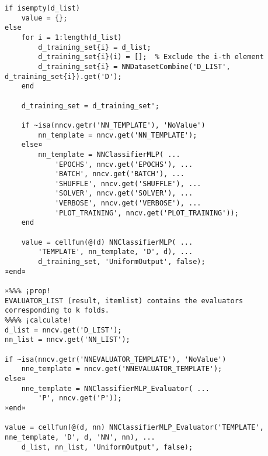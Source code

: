 \documentclass{tufte-handout}
\begin{document}
\begin{lstlisting}
if isempty(d_list)
    value = {};
else
    for i = 1:length(d_list)
        d_training_set{i} = d_list;
        d_training_set{i}(i) = [];  % Exclude the i-th element
        d_training_set{i} = NNDatasetCombine('D_LIST', d_training_set{i}).get('D');
    end
    
    d_training_set = d_training_set';
    
    if ~isa(nncv.getr('NN_TEMPLATE'), 'NoValue')
        nn_template = nncv.get('NN_TEMPLATE');
    else¤
        nn_template = NNClassifierMLP( ...
            'EPOCHS', nncv.get('EPOCHS'), ...
            'BATCH', nncv.get('BATCH'), ...
            'SHUFFLE', nncv.get('SHUFFLE'), ...
            'SOLVER', nncv.get('SOLVER'), ...
            'VERBOSE', nncv.get('VERBOSE'), ...
            'PLOT_TRAINING', nncv.get('PLOT_TRAINING'));
    end
    
    value = cellfun(@(d) NNClassifierMLP( ...
        'TEMPLATE', nn_template, 'D', d), ...
        d_training_set, 'UniformOutput', false);
¤end¤

¤%%% ¡prop!
EVALUATOR_LIST (result, itemlist) contains the evaluators corresponding to k folds.
%%%% ¡calculate!
d_list = nncv.get('D_LIST');
nn_list = nncv.get('NN_LIST');

if ~isa(nncv.getr('NNEVALUATOR_TEMPLATE'), 'NoValue')
    nne_template = nncv.get('NNEVALUATOR_TEMPLATE');
else¤
    nne_template = NNClassifierMLP_Evaluator( ...
        'P', nncv.get('P'));
¤end¤

value = cellfun(@(d, nn) NNClassifierMLP_Evaluator('TEMPLATE', nne_template, 'D', d, 'NN', nn), ...
    d_list, nn_list, 'UniformOutput', false);

\end{lstlisting}
\end{document}

